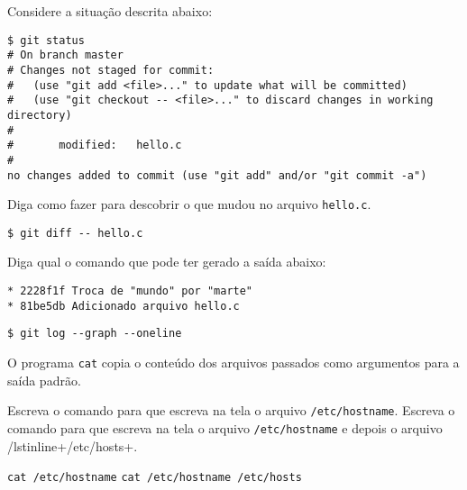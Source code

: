 \begin{Exercise}[label={0012}, difficulty={1}, origin={git}]
  Considere a situação descrita abaixo:
  \begin{lstlisting}
$ git status
# On branch master
# Changes not staged for commit:
#   (use "git add <file>..." to update what will be committed)
#   (use "git checkout -- <file>..." to discard changes in working directory)
#
#       modified:   hello.c
#
no changes added to commit (use "git add" and/or "git commit -a")
  \end{lstlisting}
  Diga como fazer para descobrir o que mudou no arquivo \lstinline+hello.c+.
\end{Exercise}
\begin{Answer}[ref={0012}]
  \begin{lstlisting}
$ git diff -- hello.c
  \end{lstlisting}
\end{Answer}

\begin{Exercise}[label={0013}, difficulty={1}, origin={git}]
  Diga qual o comando que pode ter gerado a saída abaixo:
  \begin{lstlisting}
* 2228f1f Troca de "mundo" por "marte"
* 81be5db Adicionado arquivo hello.c
  \end{lstlisting}
\end{Exercise}
\begin{Answer}[ref={0013}]
  \begin{lstlisting}
$ git log --graph --oneline
  \end{lstlisting}
\end{Answer}

\begin{Exercise}[label={0014}, difficulty={1}, origin={bash}]
  O programa \lstinline+cat+ copia o conteúdo dos arquivos passados como
  argumentos para a saída padrão.

  \Question Escreva o comando para que escreva na tela o arquivo
  \lstinline+/etc/hostname+.
  \Question Escreva o comando para que escreva na tela o arquivo
  \lstinline+/etc/hostname+ e depois o arquivo /lstinline+/etc/hosts+.
\end{Exercise}
\begin{Answer}[ref={0014}]
  \Question \lstinline+cat /etc/hostname+
  \Question \lstinline+cat /etc/hostname /etc/hosts+
\end{Answer}

